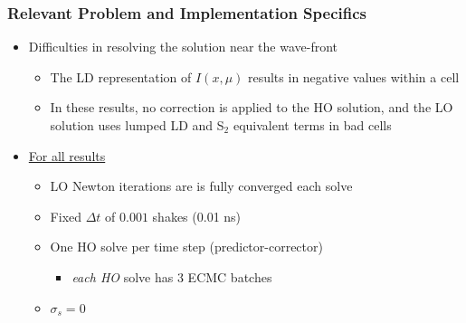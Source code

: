 \documentclass[xcolor=dvipsnames,hyperref={pdfpagelabels=false},unknownkeysallowed]{beamer}
\renewcommand{\u}[1]{\underline{#1}}
\newlength{\wideitemsep}
\let\olditem\item
\renewcommand{\item}{\setlength{\itemsep}{\wideitemsep}\olditem}
\begin{document}
\begin{frame}
    \frametitle{Relevant Problem and Implementation Specifics }
    \begin{itemize}
    \item Difficulties in resolving the solution near the wave-front
        \begin{itemize}
            \item The LD representation of $I(x,\mu)$ results in negative values within a
                cell
            \item In these results, no correction is applied to the HO solution, and the LO
                solution uses lumped LD and S$_2$ equivalent terms in bad cells
        \end{itemize}
     \pause
 \item \u{For all results}
        \begin{itemize}
    \item LO Newton iterations are is fully converged each solve
    \item Fixed $\Delta t$ of $0.001$ shakes (0.01 ns)
    \item One HO solve per time step (predictor-corrector)
        \begin{itemize}
            \item \emph{each HO} solve has 3 ECMC batches
        \end{itemize}
    \item $\sigma_s = 0$
    \end{itemize}
    \end{itemize}
\end{frame}
\end{document}
